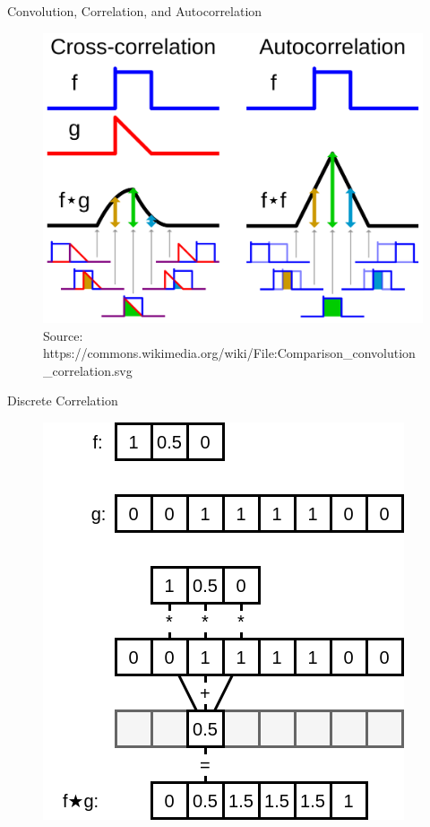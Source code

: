 \documentclass[aspectratio=169]{beamer}
\begin{document}
\begin{frame}{Convolution, Correlation, and Autocorrelation}
    \begin{figure}
        \centering
        \includegraphics[height=0.8\textheight]{Comparison_convolution_correlation}
        \caption{Source: https://commons.wikimedia.org/wiki/File:Comparison\_convolution\_correlation.svg}
    \end{figure}
\end{frame}

\begin{frame}{Discrete Correlation}
    \begin{figure}
        \centering
        \includegraphics[height=0.7\textheight]{correlation.png}

    \end{figure}
\end{frame}
\end{document}
